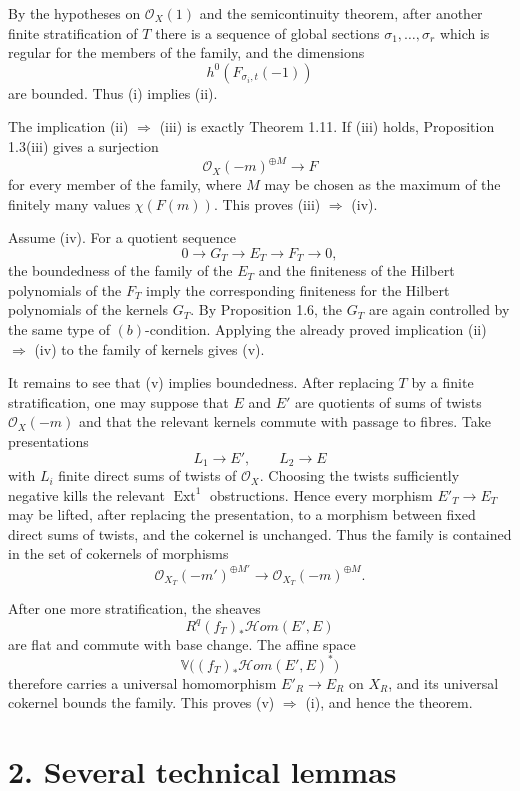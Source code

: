 \documentclass[12pt]{article}
\newcommand{\cO}{\mathcal O}
\newcommand{\longto}{\longrightarrow}
\begin{document}
By the hypotheses on $\cO_X(1)$ and the semicontinuity theorem, after another finite stratification of $T$ there is a sequence of global sections $\sigma_1,\ldots,\sigma_r$ which is regular for the members of the family, and the dimensions
\[
h^0(F_{\sigma_i,t}(-1))
\]
are bounded. Thus (i) implies (ii).

The implication (ii) $\Rightarrow$ (iii) is exactly Theorem 1.11. If (iii) holds, Proposition 1.3(iii) gives a surjection
\[
\cO_X(-m)^{\oplus M}\longto F
\]
for every member of the family, where $M$ may be chosen as the maximum of the finitely many values $\chi(F(m))$. This proves (iii) $\Rightarrow$ (iv).

Assume (iv). For a quotient sequence
\[
0\to G_T\to E_T\to F_T\to0,
\]
the boundedness of the family of the $E_T$ and the finiteness of the Hilbert polynomials of the $F_T$ imply the corresponding finiteness for the Hilbert polynomials of the kernels $G_T$. By Proposition 1.6, the $G_T$ are again controlled by the same type of $(b)$-condition. Applying the already proved implication (ii) $\Rightarrow$ (iv) to the family of kernels gives (v).

It remains to see that (v) implies boundedness. After replacing $T$ by a finite stratification, one may suppose that $E$ and $E'$ are quotients of sums of twists $\cO_X(-m)$ and that the relevant kernels commute with passage to fibres. Take presentations
\[
L_1\longto E',\qquad L_2\longto E
\]
with $L_i$ finite direct sums of twists of $\cO_X$. Choosing the twists sufficiently negative kills the relevant $\operatorname{Ext}^1$ obstructions. Hence every morphism $E'_T\to E_T$ may be lifted, after replacing the presentation, to a morphism between fixed direct sums of twists, and the cokernel is unchanged. Thus the family is contained in the set of cokernels of morphisms
\[
\cO_{X_T}(-m')^{\oplus M'}\longto \cO_{X_T}(-m)^{\oplus M}.
\]

After one more stratification, the sheaves
\[
R^q(f_T)_*\mathcal Hom(E',E)
\]
are flat and commute with base change. The affine space
\[
\mathbb V\bigl((f_T)_*\mathcal Hom(E',E)^*\bigr)
\]
therefore carries a universal homomorphism $E'_R\to E_R$ on $X_R$, and its universal cokernel bounds the family. This proves (v) $\Rightarrow$ (i), and hence the theorem.

\section*{2. Several technical lemmas}
\end{document}
